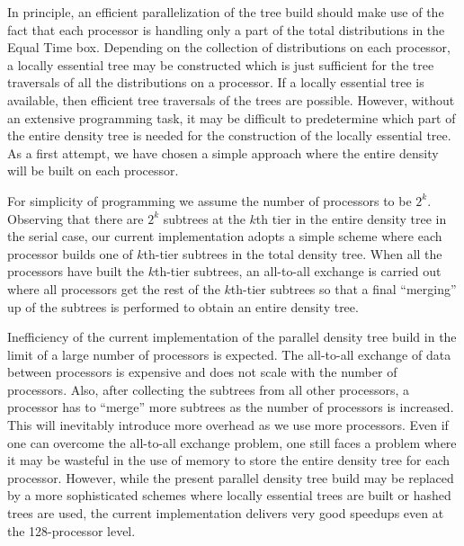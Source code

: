 \commentoutA{\documentclass[prl,aps,twocolumn,twocolumngrid,superbib]{revtex4}}
\begin{document}
In principle, an efficient parallelization of the tree build should
make use of the fact that each processor is handling only a part of
the total distributions in the Equal Time box.  Depending on the
collection of distributions on each processor, a locally essential
tree may be constructed which is just sufficient for the tree
traversals of all the distributions on a processor\cite{CGan03}.  If a
locally essential tree is available, then efficient tree traversals of
the trees are possible.  However, without an extensive programming
task, it may be difficult to predetermine which part of the entire
density tree is needed for the construction of the locally essential
tree. As a first attempt, we have chosen a simple approach where the
entire density will be built on each processor.

For simplicity of programming we assume the number of processors to be
$2^k$. Observing that there are $2^k$ subtrees at the $k$th tier in
the entire density tree in the serial case, our current implementation
adopts a simple scheme where each processor builds one of $k$th-tier
subtrees in the total density tree. When all the processors have built
the $k$th-tier subtrees, an all-to-all exchange is carried out where
all processors get the rest of the $k$th-tier subtrees so that a final
``merging'' up of the subtrees\cite{MChallacombe97,CTymczak04a} is
performed to obtain an entire density tree.

Inefficiency of the current implementation of the parallel density
tree build in the limit of a large number of processors is expected.
The all-to-all exchange of data between processors is expensive and
does not scale with the number of processors. Also, after collecting
the subtrees from all other processors, a processor has to ``merge''
more subtrees as the number of processors is increased. This will
inevitably introduce more overhead as we use more processors.  Even if
one can overcome the all-to-all exchange problem, one still faces a
problem where it may be wasteful in the use of memory to store the
entire density tree for each processor.  However, while the present
parallel density tree build may be replaced by a more sophisticated
schemes where locally essential trees are built\cite{MWarren92} or
hashed trees are used\cite{MWarren93,MWarren95b}, the current
implementation delivers very good speedups even at the 128-processor
level.
\end{document}
